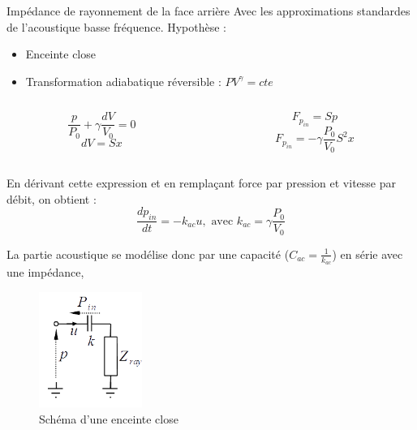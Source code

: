 \documentclass[aspectratio=169]{beamer}
\begin{document}
\begin{frame}{Impédance de rayonnement de la face arrière}
Avec les approximations standardes de l'acoustique basse fréquence.
Hypothèse : 
\begin{itemize}
	\item Enceinte close
	\item Transformation adiabatique réversible : $P V^\gamma = cte$
\end{itemize}
\begin{columns}[t]\small
  \begin{column}{.5\textwidth}
  	\begin{displaymath}
		\frac{p}{P_0} + \gamma \frac{dV}{V_0} = 0
	\end{displaymath}
	\begin{displaymath}
		dV = Sx
	\end{displaymath}
  \end{column}
  \begin{column}{.4\textwidth}
 	\begin{displaymath}
		F_{p_{in}}= Sp
	\end{displaymath}
	\begin{displaymath}
		F_{p_{in}}= -\gamma\frac{P_0}{V_0}S^2 x
	\end{displaymath}

  \end{column}
\end{columns}
	En dérivant cette expression et en remplaçant force par pression et vitesse par débit, on obtient :
	\begin{equation}
		\frac{dp_{in}}{dt} = -k_{ac}u, \text{ avec $k_{ac}=\gamma\frac{P_0}{V_0}$}
	\end{equation}
	
	La partie acoustique se modélise donc par une capacité ($C_{ac}=\frac{1}{k_{ac}}$) en série avec une impédance, 
\end{frame}
\begin{frame}
	\begin{figure}[!h]
	\begin{center}
	\includegraphics[width=0.3\textwidth]{figure/schema_acoustique.png}
	\end{center}
	\caption{Schéma d'une enceinte close}
	\label{schema_acou}
	\end{figure}	
\end{frame}
\end{document}
